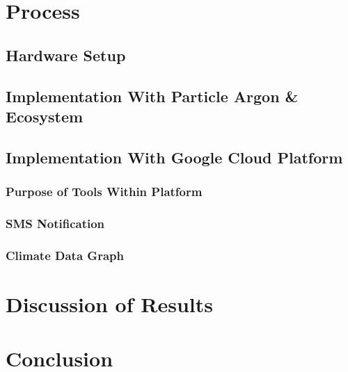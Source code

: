 \documentclass{article}
\begin{document}
\section{Process}
\subsection{Hardware Setup}
\subsection{Implementation With Particle Argon \& Ecosystem}
\subsection{Implementation With Google Cloud Platform }
\subsubsection{Purpose of Tools Within Platform}
\subsubsection{SMS Notification}
\subsubsection{Climate Data Graph}




\section{Discussion of Results}

\section{Conclusion}
\end{document}
